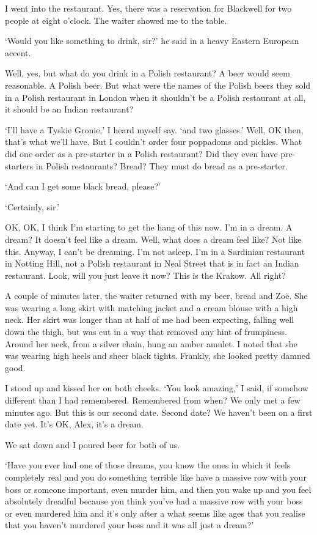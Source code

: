 I went into the restaurant. Yes, there was a reservation for
Blackwell for two people at eight o'clock. The waiter showed me to
the table.

`Would you like something to drink, sir?' he said in a heavy Eastern
European accent.

Well, yes, but what do you drink in a Polish restaurant? A beer
would seem reasonable. A Polish beer. But what were the names of the
Polish beers they sold in a Polish restaurant in London when it
shouldn't be a Polish restaurant at all, it should be an Indian
restaurant?

`I'll have a Tyskie Gronie,' I heard myself say. `and two glasses.' Well, OK then,
that's what we'll have. But I couldn't order four poppadoms and
pickles. What did one order as a pre-starter in a Polish restaurant?
Did they even have pre-starters in Polish restaurants? Bread? They
must do bread as a pre-starter.

`And can I get some black bread, please?'

`Certainly, sir.'

OK, OK, I think I'm starting to get the hang of this now. I'm in a
dream. A dream? It doesn't feel like a dream. Well, what does a
dream feel like? Not like this. Anyway, I can't be dreaming. I'm not
asleep. I'm in a Sardinian restaurant in Notting Hill, not a Polish
restaurant in Neal Street that is in fact an Indian restaurant. Look,
will you just leave it now? This is the Krakow. All right?

A couple of minutes later, the waiter returned with my beer, bread
and Zoë. She was wearing a long skirt with matching jacket and a
cream blouse with a high neck. Her skirt was longer than at half of me had been
expecting, falling well down the thigh, but was cut in a way that
removed any hint of frumpiness. Around her neck, from a silver
chain, hung an amber amulet. I noted that she was
wearing high heels and sheer black tights. Frankly, she looked pretty damned good.

I stood up and kissed her on both cheeks. `You look amazing,' I
said, if somehow different than I had remembered. Remembered from
when? We only met a few minutes ago. But this is our second date.
Second date? We haven't been on a first date yet. It's OK, Alex,
it's a dream.

We sat down and I poured beer for both of us.

`Have you ever had one of those dreams, you know the ones in which
it feels completely real and you do something terrible like have a
massive row with your boss or someone important, even murder him, and then
you wake up and you feel absolutely dreadful because you think
you've had a massive row with your boss or even murdered him and it's only after a what seems like ages that you realise that you haven't
murdered your boss and it was all just a dream?'

